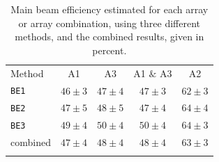 \begin{table}[!h]
  \caption[]{Main beam efficiency estimated for each array or array
  combination, using three different methods, and the combined
  results, given in percent.}
  \label{tab:beam_efficiency}
  \centering
  \begin{tabular}{l cccc}
    \hline\hline
    \noalign{\smallskip}
    Method & A1 &  A3 & A1 $\&$ A3 &  A2  \\
    \noalign{\smallskip}
    \hline
    \noalign{\smallskip}
    {\tt BE1}  &  $46 \pm 3$  & $47 \pm 4$  &  $47 \pm 3$  &  $62 \pm 3$  \\
    {\tt BE2}  &  $47 \pm 5$  & $48 \pm 5$  &  $47 \pm 4$  &  $64 \pm 4$  \\
    {\tt BE3}  &  $49 \pm 4$  & $50 \pm 4$  &  $50 \pm 4$  &  $64 \pm 3$  \\
    combined   &  $47 \pm 4$  & $48 \pm 4$  &  $48 \pm 4$  &  $63 \pm 3$  \\
    \noalign{\smallskip}
    \hline
  \end{tabular}
\end{table}



